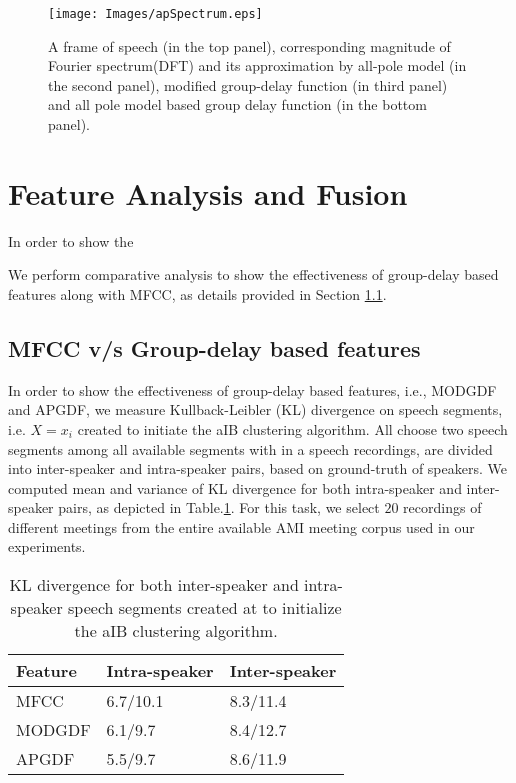 \documentclass[conference]{IEEEtran}
\begin{document}
\begin{figure}[h]
\centering
\texttt{[image: Images/apSpectrum.eps]}
\caption{ A frame of speech (in the top panel), corresponding magnitude of Fourier spectrum(DFT) and its approximation by all-pole model (in the second panel), modified group-delay function (in third panel) and all pole model based group delay function (in the bottom panel).}
\label{fig:all-pole}
\end{figure}



\section{Feature Analysis and Fusion}
\label{feature_analysis_and_fusion}

In order to show the 

We perform comparative analysis to show the effectiveness of group-delay based features along with MFCC, as details provided in Section \ref{feature_analysis}. 


\subsection{MFCC v/s Group-delay based features}
\label{feature_analysis}
In order to show the effectiveness of group-delay based features, i.e., MODGDF and APGDF, we measure Kullback-Leibler (KL) divergence on speech segments, i.e. $X={x_i}$ created to initiate the aIB clustering algorithm. All choose two speech segments among all available segments with in a speech recordings, are divided into inter-speaker and intra-speaker pairs, based on ground-truth of speakers. We computed mean and variance of KL divergence for both intra-speaker and inter-speaker pairs, as depicted in Table.\ref{table:kl-div}. For this task, we select $20$ recordings of different meetings from the entire available AMI meeting corpus used in our experiments. 


\begin{table}[h]
\centering

\label{table:kl-div}
\begin{tabular}{|l|l|l|}
\hline
Feature 			& Intra-speaker 			& Inter-speaker 	 \\ \hline
MFCC          			& 6.7/10.1               & 8.3/11.4       \\ \hline
MODGDF        			& 6.1/9.7                & 8.4/12.7       \\ \hline
APGDF         			& 5.5/9.7                & 8.6/11.9        \\ \hline
\end{tabular}

\vspace{0.4cm}
\caption{KL divergence for both inter-speaker and intra-speaker speech segments created at to initialize the aIB clustering algorithm.}
\end{table}
\end{document}
